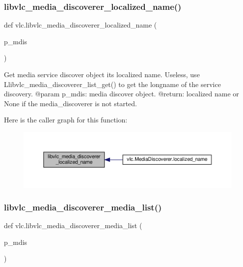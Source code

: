\subsubsection{\texorpdfstring{libvlc\+\_\+media\+\_\+discoverer\+\_\+localized\+\_\+name()}{libvlc\_media\_discoverer\_localized\_name()}}
{\footnotesize\ttfamily def vlc.\+libvlc\+\_\+media\+\_\+discoverer\+\_\+localized\+\_\+name (\begin{DoxyParamCaption}\item[{}]{p\+\_\+mdis }\end{DoxyParamCaption})}

\begin{DoxyVerb}Get media service discover object its localized name.
\deprecated Useless, use L{libvlc_media_discoverer_list_get}() to get the
longname of the service discovery.
@param p_mdis: media discover object.
@return: localized name or None if the media_discoverer is not started.
\end{DoxyVerb}
 Here is the caller graph for this function\+:
\nopagebreak
\begin{figure}[H]
\begin{center}
\leavevmode
\includegraphics[width=350pt]{namespacevlc_a3b2a41bfb1a505c80af56dad8ce507ac_icgraph}
\end{center}
\end{figure}
\mbox{\label{namespacevlc_a7a67121178840567c764d45a7965d52b}} 
\subsubsection{\texorpdfstring{libvlc\+\_\+media\+\_\+discoverer\+\_\+media\+\_\+list()}{libvlc\_media\_discoverer\_media\_list()}}
{\footnotesize\ttfamily def vlc.\+libvlc\+\_\+media\+\_\+discoverer\+\_\+media\+\_\+list (\begin{DoxyParamCaption}\item[{}]{p\+\_\+mdis }\end{DoxyParamCaption})}

